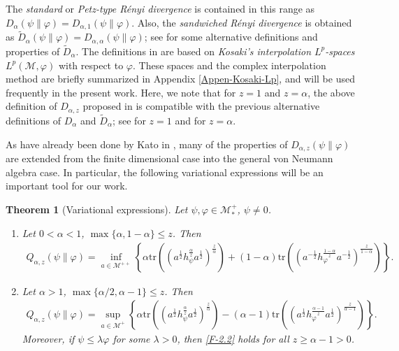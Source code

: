 \documentclass[12pt]{article}
\newtheorem{theorem}{Theorem}[section]
\theoremstyle{definition}
\theoremstyle{remark}
\numberwithin{equation}{section}
\def\Me{\mathcal M}
\def\Tr{\mathrm{tr}}
\def\ffi{\varphi}
\begin{document}
The \emph{standard} or \emph{Petz-type R\'enyi divergence}
\cite{petz1985quasi,hiai2018quantum,hiai2021quantum} is contained in this range as
$D_\alpha(\psi\|\varphi)=D_{\alpha,1}(\psi\|\varphi)$. Also, the \emph{sandwiched R\'enyi divergence} is
obtained as $\tilde D_\alpha(\psi\|\varphi)=D_{\alpha,\alpha}(\psi\|\varphi)$; see
\cite{berta2018renyi,hiai2021quantum,jencova2018renyi, jencova2021renyi} for some
alternative definitions and properties of $\tilde D_\alpha$. The definitions in
\cite{jencova2018renyi,jencova2021renyi} are based on \emph{Kosaki's interpolation $L^p$-spaces}
$L^p(\Me,\varphi)$ \cite{kosaki1984applications} with respect to $\varphi$. These spaces and the
complex interpolation method are briefly summarized in Appendix \ref{Appen-Kosaki-Lp}, and will be used
frequently in the present work. Here, we note that for $z=1$ and $z=\alpha$, the above
definition of $D_{\alpha,z}$ proposed in \cite{kato2023aremark, kato2023onrenyi} is compatible with the
previous alternative definitions of $D_\alpha$ and $\tilde D_\alpha$; see \cite[Theorem 3.6]{hiai2021quantum}
for $z=1$ and \cite[Lemma 9]{kato2023aremark} for $z=\alpha$.


As have already been done by Kato in \cite{kato2023onrenyi}, many of the properties of
$D_{\alpha,z}(\psi\|\varphi)$ are extended from the finite dimensional case into the general von Neumann
algebra case. In particular, the following variational expressions will be an important tool for our work.

\begin{theorem}[Variational expressions]\label{thm:variational} Let $\psi,\varphi\in \Me_*^+$, $\psi\ne 0$. 
\begin{enumerate}
\item[(i)] Let $0<\alpha<1$, $\max\{\alpha,1-\alpha\}\le z$. Then
\begin{align}\label{F-2.1}
Q_{\alpha,z}(\psi\|\varphi)=\inf_{a\in \Me^{++}}\left\{\alpha
\Tr\left((a^{\frac12}h_\psi^{\frac{\alpha}{z}}a^{\frac12})^{\frac{z}{\alpha}}\right)+(1-\alpha)
\Tr\left((a^{-\frac12}h_\varphi^{\frac{1-\alpha}{z}}a^{-\frac12})^{\frac{z}{1-\alpha}}\right) \right\}.
\end{align}

\item[(ii)] Let $\alpha>1$, $\max\{\alpha/2,\alpha-1\}\le z$. Then
\begin{align}\label{F-2.2}
Q_{\alpha,z}(\psi\|\varphi)=\sup_{a\in \Me^+} \left\{\alpha
\Tr\left((a^{\frac12}h_\psi^{\frac{\alpha}{z}}a^{\frac12})^{\frac{z}{\alpha}}\right)-(\alpha-1)
\Tr\left((a^{\frac12}h_\varphi^{\frac{\alpha-1}{z}}a^{\frac12})^{\frac{z}{\alpha-1}}\right) \right\}.
\end{align}
Moreover, if $\psi\le\lambda\ffi$ for some $\lambda>0$, then \eqref{F-2.2} holds for all
$z\ge\alpha-1>0$.
\end{enumerate}
\end{theorem}
\end{document}
